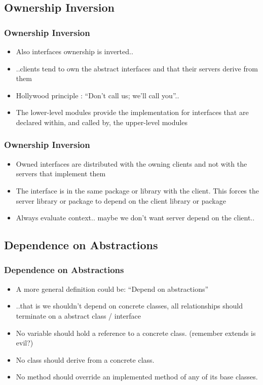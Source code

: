 \documentclass{beamer}
\begin{document}
\subsection{Ownership Inversion}
\begin{frame}
  \frametitle{Ownership Inversion}
  \begin{itemize}
	\item<+-> Also interfaces ownership is inverted.. 
	\item<+-> ..clients tend to own the abstract interfaces and that their servers derive from them
	\item<+-> Hollywood principle : ``Don't call us; we'll call you''..
	\item<+-> The lower-level modules provide the implementation for interfaces that are declared within, and called by, the upper-level modules
   \end{itemize}
\end{frame}

\begin{frame}
  \frametitle{Ownership Inversion}
  \begin{itemize}
	\item<+-> Owned interfaces are distributed with the owning clients and not with the servers that implement them
	\item<+-> The interface is in the same package or library with the client. This forces the server library or package to depend on the client library or package
	\item<+-> Always evaluate context.. maybe we don't want server depend on the client..
   \end{itemize}
\end{frame}

\subsection{Dependence on Abstractions}
\begin{frame}
  \frametitle{Dependence on Abstractions}
  \begin{itemize}
	\item<+-> A more general definition could be: ``Depend on abstractions''
	\item<+-> ..that is we shouldn't depend on concrete classes, all relationships should terminate on a abstract class / interface
	\item<+-> No variable should hold a reference to a concrete class. (remember extends is evil?)
	\item<+-> No class should derive from a concrete class.
	\item<+-> No method should override an implemented method of any of its base classes.
  \end{itemize}
\end{frame}
\end{document}
